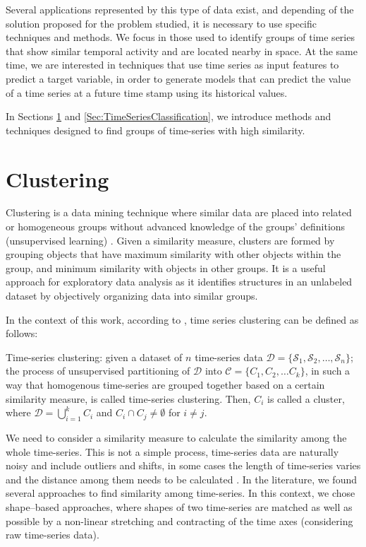 Several applications represented by this type of data exist, and depending of the solution proposed for the problem studied, it is necessary to use specific techniques and methods. We focus in those used to identify groups of time series that show similar temporal activity and are located nearby in space. At the same time, we are interested in techniques that use time series as input features to predict a target variable, in order to generate models that can predict the value of a time series at a future time stamp using its historical values.

In Sections \ref{Sec:TimeSeriesClustering} and \ref{Sec:TimeSeriesClassification}, we introduce methods and techniques designed to find groups of time-series with high similarity. 

\section{Clustering}
\label{Sec:TimeSeriesClustering}

Clustering is a data mining technique where similar data are placed into related or homogeneous groups without advanced knowledge of the groups' definitions (unsupervised learning) \cite{HastieTF2009}. Given a similarity measure, clusters are formed by grouping objects that have maximum similarity with other objects within the group, and minimum similarity with objects in other groups. It is a useful approach for exploratory data analysis as it identifies structures in an unlabeled dataset by objectively organizing data into similar groups.

In the context of this work, according to \cite{Aghabozorgi2015}, time series clustering can be defined as follows:

\begin{definition} Time-series clustering: given a dataset of $n$ time-series data $\mathcal{D} = \{\mathcal{S}_1, \mathcal{S}_2, \ldots, \mathcal{S}_n\}$; the process of unsupervised partitioning of $\mathcal{D}$ into $\mathcal{C} = \{C_1, C_2, \ldots C_k\}$, in such a way
that homogenous time-series are grouped together based on a certain similarity measure, is called time-series clustering. Then, $C_i$ is called a cluster, where $\mathcal{D} = \bigcup_{i=1}^{k} C_{i}$ and $C_i \cap C_j \neq \emptyset$ for $i \neq j$.
\end{definition}

We need to consider a similarity measure to calculate the similarity among the whole time-series. This is not a simple process, time-series data are naturally noisy and include outliers and shifts, in some cases the length of time-series varies and the distance among them needs to be calculated \cite{Pal2017}. In the literature, we found several approaches to find similarity among time-series. In this context, we chose shape--based approaches, where shapes of two time-series are matched as well as possible by a non-linear stretching and contracting of the time axes (considering raw time-series data).

